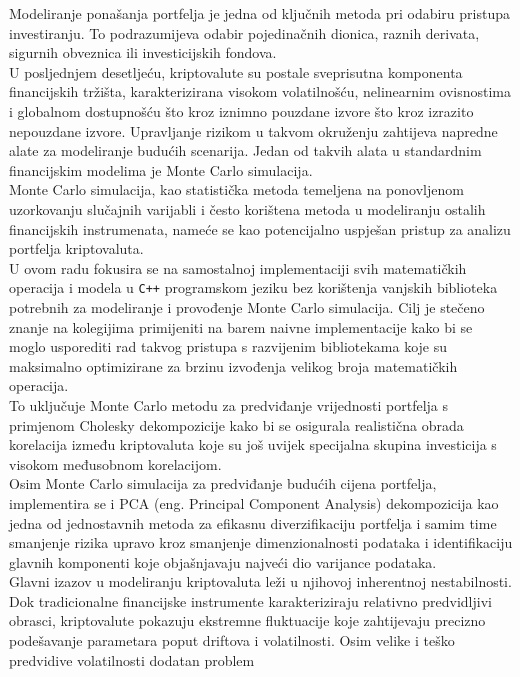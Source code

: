 \documentclass[zavrsnirad, upload]{fer}
\begin{document}
Modeliranje ponašanja portfelja je jedna od ključnih metoda pri odabiru pristupa
investiranju. To podrazumijeva odabir pojedinačnih dionica, raznih
derivata, sigurnih obveznica ili investicijskih fondova.\\
U posljednjem desetljeću, kriptovalute su postale sveprisutna
komponenta financijskih tržišta, karakterizirana visokom volatilnošću,
nelinearnim ovisnostima i globalnom dostupnošću što kroz iznimno pouzdane izvore
što kroz izrazito nepouzdane izvore.
Upravljanje rizikom u takvom okruženju zahtijeva napredne alate za
modeliranje budućih scenarija.
Jedan od takvih alata u standardnim financijskim modelima je Monte Carlo
simulacija.\\
Monte Carlo simulacija, kao statistička metoda temeljena na ponovljenom
uzorkovanju slučajnih varijabli i često korištena metoda u modeliranju
ostalih financijskih instrumenata, nameće se kao potencijalno uspješan
pristup za analizu portfelja kriptovaluta.\\
U ovom radu fokusira se na samostalnoj implementaciji svih matematičkih
operacija i modela u \texttt{C++} programskom jeziku bez korištenja
vanjskih biblioteka potrebnih za modeliranje i provođenje Monte
Carlo simulacija. Cilj je stečeno znanje na kolegijima primijeniti
na barem naivne implementacije kako bi se moglo usporediti rad takvog
pristupa s razvijenim bibliotekama koje su maksimalno optimizirane
za brzinu izvođenja velikog broja matematičkih operacija.
\\
To uključuje Monte Carlo metodu za predviđanje vrijednosti portfelja s primjenom
Cholesky dekompozicije kako bi se osigurala realistična obrada
korelacija između kriptovaluta koje su još uvijek specijalna skupina investicija
s visokom međusobnom korelacijom.\\
Osim Monte Carlo simulacija za predviđanje budućih cijena portfelja,
implementira se i PCA (eng. Principal Component Analysis) dekompozicija
kao jedna od jednostavnih metoda za efikasnu diverzifikaciju portfelja
i samim time smanjenje rizika upravo kroz smanjenje dimenzionalnosti podataka
i identifikaciju glavnih komponenti koje objašnjavaju najveći dio
varijance podataka.\\
Glavni izazov u modeliranju kriptovaluta leži u njihovoj inherentnoj
nestabilnosti. Dok tradicionalne financijske instrumente karakteriziraju
relativno predvidljivi obrasci, kriptovalute pokazuju ekstremne fluktuacije
koje zahtijevaju precizno podešavanje parametara poput driftova i
volatilnosti. Osim velike i teško predvidive volatilnosti dodatan problem
\end{document}
